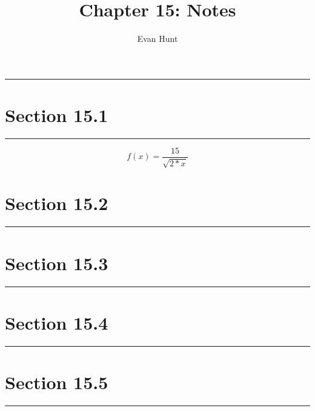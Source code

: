 \documentclass[12pt]{article}
\title{Chapter 15: Notes}
\author{Evan Hunt}
\begin{document}
    \maketitle

    \noindent\rule{\textwidth}{0.4pt}
    \section[]{Section 15.1}
    \noindent\rule{\textwidth}{0.4pt}
        \begin{equation}
            f(x) = \frac{15}{\sqrt{2*x}}
        \end{equation}
    \section[]{Section 15.2}
    \noindent\rule{\textwidth}{0.4pt}
    \section[]{Section 15.3}
    \noindent\rule{\textwidth}{0.4pt}
    \section[]{Section 15.4}
    \noindent\rule{\textwidth}{0.4pt}
    \section[]{Section 15.5}
    \noindent\rule{\textwidth}{0.4pt}
\end{document}
